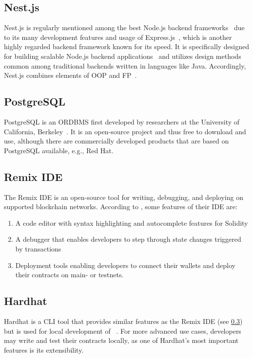 \subsection{Nest.js}\label{subsec:nest.js}

Nest.js is regularly mentioned among the best Node.js backend frameworks~\autocites{clever_solution_9_2020}{labay_10_2020}{patel_top_2022} due to its many development features and usage of Express.js~\autocite{mysliwiec_documentation_nodate}, which is another highly regarded backend framework known for its speed.
It is specifically designed for building scalable Node.js backend applications~\autocite{mysliwiec_documentation_nodate} and utilizes design methods common among traditional backends written in languages like Java.
Accordingly, Nest.js combines elements of \gls{OOP} and \gls{FP}~\autocite{mysliwiec_documentation_nodate}.

\subsection{PostgreSQL}\label{subsec:postgresql}

PostgreSQL is an \gls{ORDBMS} first developed by researchers at the University of California, Berkeley~\autocite[3]{worsley_practical_2002}.
It is an open-source project and thus free to download and use, although there are commercially developed products that are based on PostgreSQL available, e.g., Red Hat.

\subsection{Remix IDE}\label{subsec:remix-ide}

The Remix \gls{IDE} is an open-source tool for writing, debugging, and deploying  on supported blockchain networks.
According to \textcite{remix_project_welcome_nodate}, some features of their \gls{IDE} are:

\begin{enumerate}
    \item A code editor with syntax highlighting and autocomplete features for Solidity
    \item A debugger that enables developers to step through state changes triggered by transactions
    \item Deployment tools enabling developers to connect their wallets and deploy their contracts on main- or testnets.
\end{enumerate}

\subsection{Hardhat}\label{subsec:hardhat}

Hardhat is a \gls{CLI} tool that provides similar features as the Remix \gls{IDE} (see \cref{subsec:remix-ide}) but is used for local development of ~\autocite{hardhat_documentation_nodate}.
For more advanced use cases, developers may write and test their contracts locally, as one of Hardhat's most important features is its extensibility.